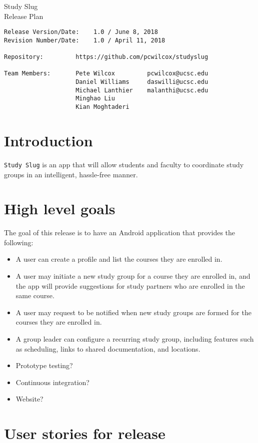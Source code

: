\documentclass[10pt]{article}
\begin{document}
    
    \begin{center}
        \Huge{Study Slug} \\
        \Large{Release Plan}
    \end{center}
    \begin{verbatim}
Release Version/Date:    1.0 / June 8, 2018        
Revision Number/Date:    1.0 / April 11, 2018

Repository:         https://github.com/pcwilcox/studyslug

Team Members:       Pete Wilcox         pcwilcox@ucsc.edu    
                    Daniel Williams     daswilli@ucsc.edu  
                    Michael Lanthier    malanthi@ucsc.edu  
                    Minghao Liu
                    Kian Moghtaderi 
    \end{verbatim}
    
    \section{Introduction}
    \texttt{Study Slug} is an app that will allow students and faculty to coordinate study groups in an intelligent, hassle-free manner.
    
    \section{High level goals}
    The goal of this release is to have an Android application that provides the following:
    \begin{itemize}
        \item A user can create a profile and list the courses they are enrolled in.
        \item A user may initiate a new study group for a course they are enrolled in, and the app will provide suggestions for study partners who are enrolled in the same course.
        \item A user may request to be notified when new study groups are formed for the courses they are enrolled in.
        \item A group leader can configure a recurring study group, including features such as scheduling, links to shared documentation, and locations.
        \item Prototype testing?
        \item Continuous integration?
        \item Website?
    \end{itemize}
    
    \section{User stories for release}
\end{document}
